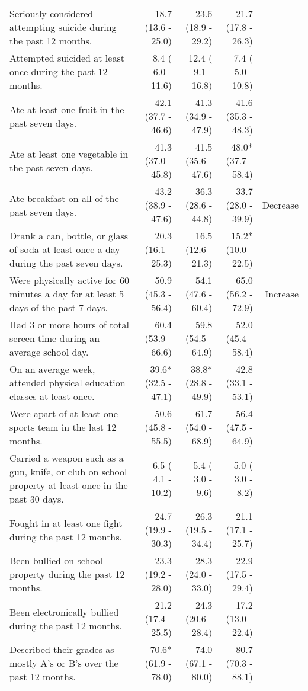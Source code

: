 \documentclass[11pt]{article}
\begin{document}
\begin{longtable}{p{12cm}|rrr|r}
  Seriously considered attempting suicide during the past 12 months. & 18.7 (13.6 - 25.0) & 23.6 (18.9 - 29.2) & 21.7 (17.8 - 26.3) &  \\ 
  Attempted suicided at least once during the past 12 months. &  8.4 ( 6.0 - 11.6) & 12.4 ( 9.1 - 16.8) &  7.4 ( 5.0 - 10.8) &  \\ 
  Ate at least one fruit in the past seven days.  & 42.1 (37.7 - 46.6) & 41.3 (34.9 - 47.9) & 41.6 (35.3 - 48.3) &  \\ 
  Ate at least one vegetable in the past seven days.  & 41.3 (37.0 - 45.8) & 41.5 (35.6 - 47.6) & 48.0*(37.7 - 58.4) &  \\ 
  Ate breakfast on all of the past seven days. & 43.2 (38.9 - 47.6) & 36.3 (28.6 - 44.8) & 33.7 (28.0 - 39.9) & Decrease \\ 
  Drank a can, bottle, or glass of soda at least once a day during the past seven days. & 20.3 (16.1 - 25.3) & 16.5 (12.6 - 21.3) & 15.2*(10.0 - 22.5) &  \\ 
  Were physically active for 60 minutes a day for at least 5 days of the past 7 days. & 50.9 (45.3 - 56.4) & 54.1 (47.6 - 60.4) & 65.0 (56.2 - 72.9) & Increase \\ 
  Had 3 or more hours of total screen time during an average school day. & 60.4 (53.9 - 66.6) & 59.8 (54.5 - 64.9) & 52.0 (45.4 - 58.4) &  \\ 
  On an average week, attended physical education classes at least once. & 39.6*(32.5 - 47.1) & 38.8*(28.8 - 49.9) & 42.8 (33.1 - 53.1) &  \\ 
  Were apart of at least one sports team in the last 12 months. & 50.6 (45.8 - 55.5) & 61.7 (54.0 - 68.9) & 56.4 (47.5 - 64.9) &  \\ 
  Carried a weapon such as a gun, knife, or club on school property at least once in the past 30 days. &  6.5 ( 4.1 - 10.2) &  5.4 ( 3.0 -  9.6) &  5.0 ( 3.0 -  8.2) &  \\ 
  Fought in at least one fight during the past 12 months. & 24.7 (19.9 - 30.3) & 26.3 (19.5 - 34.4) & 21.1 (17.1 - 25.7) &  \\ 
  Been bullied on school property during the past 12 months. & 23.3 (19.2 - 28.0) & 28.3 (24.0 - 33.0) & 22.9 (17.5 - 29.4) &  \\ 
  Been electronically bullied during the past 12 months. & 21.2 (17.4 - 25.5) & 24.3 (20.6 - 28.4) & 17.2 (13.0 - 22.4) &  \\ 
  Described their grades as mostly A's or B's over the past 12 months. & 70.6*(61.9 - 78.0) & 74.0 (67.1 - 80.0) & 80.7 (70.3 - 88.1) &  \\ 

\end{longtable}
\end{document}
